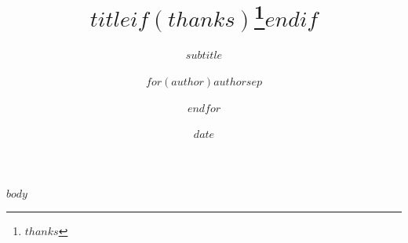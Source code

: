 \documentclass[
  b5paper
]{book}
\title{$title$$if(thanks)$\thanks{$thanks$}$endif$}
\subtitle{$subtitle$}
\author{$for(author)$$author$$sep$ \and $endfor$}
\date{$date$}
\institute{$for(institute)$$institute$$sep$ \and $endfor$}
\begin{document}
\setlength{\RaggedRightParindent}{1em}
\RaggedRight
{}

\maketitle

\tableofcontents

$body$
\end{document}

